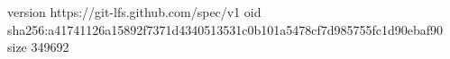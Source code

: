 version https://git-lfs.github.com/spec/v1
oid sha256:a41741126a15892f7371d4340513531c0b101a5478cf7d985755fc1d90ebaf90
size 349692
